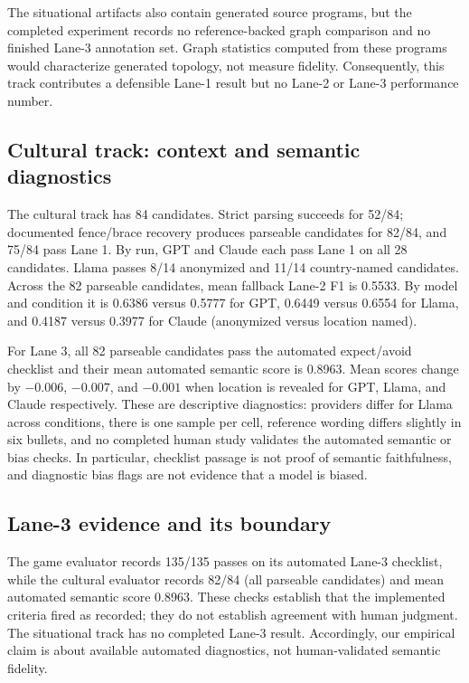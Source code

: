 \documentclass{article}
\begin{document}
The situational artifacts also contain generated source programs, but the completed experiment records no reference-backed graph comparison and no finished Lane-3 annotation set. Graph statistics computed from these programs would characterize generated topology, not measure fidelity. Consequently, this track contributes a defensible Lane-1 result but no Lane-2 or Lane-3 performance number.

\subsection{Cultural track: context and semantic diagnostics}
The cultural track has 84 candidates. Strict parsing succeeds for 52/84; documented fence/brace recovery produces parseable candidates for 82/84, and 75/84 pass Lane 1. By run, GPT and Claude each pass Lane 1 on all 28 candidates. Llama passes 8/14 anonymized and 11/14 country-named candidates. Across the 82 parseable candidates, mean fallback Lane-2 F1 is 0.5533. By model and condition it is 0.6386 versus 0.5777 for GPT, 0.6449 versus 0.6554 for Llama, and 0.4187 versus 0.3977 for Claude (anonymized versus location named).

For Lane 3, all 82 parseable candidates pass the automated expect/avoid checklist and their mean automated semantic score is 0.8963. Mean scores change by $-0.006$, $-0.007$, and $-0.001$ when location is revealed for GPT, Llama, and Claude respectively. These are descriptive diagnostics: providers differ for Llama across conditions, there is one sample per cell, reference wording differs slightly in six bullets, and no completed human study validates the automated semantic or bias checks. In particular, checklist passage is not proof of semantic faithfulness, and diagnostic bias flags are not evidence that a model is biased.

\subsection{Lane-3 evidence and its boundary}
The game evaluator records 135/135 passes on its automated Lane-3 checklist, while the cultural evaluator records 82/84 (all parseable candidates) and mean automated semantic score 0.8963. These checks establish that the implemented criteria fired as recorded; they do not establish agreement with human judgment. The situational track has no completed Lane-3 result. Accordingly, our empirical claim is about available automated diagnostics, not human-validated semantic fidelity.
\end{document}
